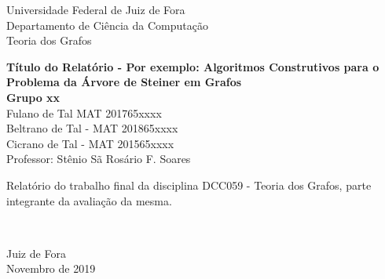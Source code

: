 %






\vspace*{-2cm}
{\bf
\begin{center}
{\large
\hspace*{0cm}Universidade Federal de Juiz de Fora} \\
\hspace*{0cm}Departamento de Ciência da Computa\c{c}\~ao \\
\hspace*{0cm} Teoria dos Grafos \\
\end{center}}
\vspace{3.0cm}
\noindent
\begin{center}
{\Large \bf Título do Relatório - Por exemplo: Algoritmos Construtivos para o Problema da Árvore de Steiner em Grafos} \\[3cm]
{\Large \textbf{Grupo xx}}\\[10mm]
{ Fulano de Tal  MAT 201765xxxx }\\[3mm]
{ Beltrano de Tal  - MAT 201865xxxx}\\[3mm]
{ Cicrano de Tal  - MAT 201565xxxx}\\[15mm]

{\Large Professor: Stênio Sã Rosário F. Soares}\\[1.0cm]
\end{center}




{\raggedleft
\begin{minipage}[t]{6.3cm}
\setlength{\baselineskip}{0.25in}
Relatório do  trabalho final da disciplina DCC059 - Teoria dos Grafos, parte integrante da avalia\c{c}\~ao da mesma.
\end{minipage}\\[1cm]}
\vspace{0.2cm}
{\center Juiz de Fora \\[3mm]
Novembro de 2019 \\}


\newpage
